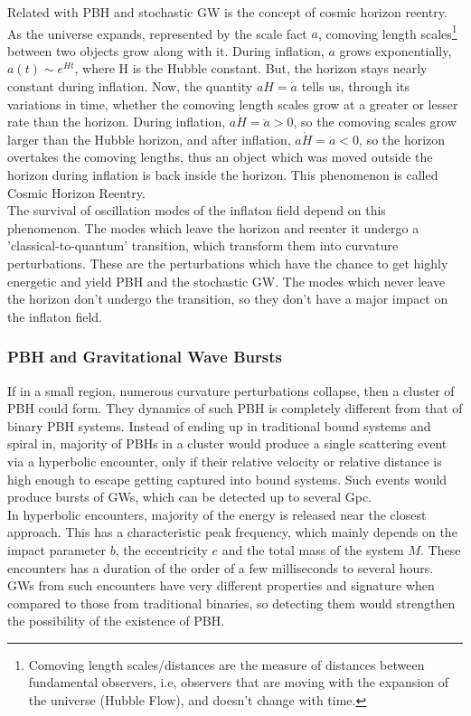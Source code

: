 Related with PBH and stochastic GW is the concept of cosmic horizon reentry. As the universe expands, represented by the scale fact $a$, comoving length scales\footnote{Comoving length scales/distances are the measure of distances between fundamental observers, i.e, observers that are moving with the expansion of the universe (Hubble Flow), and doesn't change with time.}  between two objects grow along with it. During inflation, $a$ grows exponentially, $a(t) \sim e^{Ht}$, where H is the Hubble constant. But, the horizon stays nearly constant during inflation. Now, the quantity $aH = \dot{a}$ tells us, through its variations in time, whether the comoving length scales grow at a greater or lesser rate than the horizon. During inflation, $a\dot{H} = \ddot{a} > 0$, so the comoving scales grow larger than the Hubble horizon, and after inflation, $a\dot{H} = \ddot{a} < 0$, so the horizon overtakes the comoving lengths, thus an object which was moved outside the horizon during inflation is back inside the horizon. This phenomenon is called Cosmic Horizon Reentry.\\

The survival of oscillation modes of the inflaton field depend on this phenomenon. The modes which leave the horizon and reenter it undergo a 'classical-to-quantum' transition, which transform them into curvature perturbations. These are the perturbations which have the chance to get highly energetic and yield PBH and the stochastic GW. The modes which never leave the horizon don't undergo the transition, so they don't have a major impact on the inflaton field. \cite{CHE}

\subsubsection{PBH and Gravitational Wave Bursts}
If in a small region, numerous curvature perturbations collapse, then a cluster of PBH could form. They dynamics of such PBH is completely different from that of binary PBH systems. Instead of ending up in traditional bound systems and spiral in, majority of PBHs in a cluster would produce a single scattering event via a hyperbolic encounter, only if their relative velocity or relative distance is high enough to escape getting captured into bound systems. Such events would produce bursts of GWs, which can be detected up to several Gpc. \\

In hyperbolic encounters, majority of the energy is released near the closest approach. This has a characteristic peak frequency, which mainly depends on the impact parameter $b$, the eccentricity $e$ and the total mass of the system $M$. These encounters has a duration of the order of a few milliseconds to several hours. GWs from such encounters have very different properties and signature when compared to those from traditional binaries, so detecting them would strengthen the possibility of the existence of PBH. \cite{Garc_a_Bellido_2017}
\pagebreak
